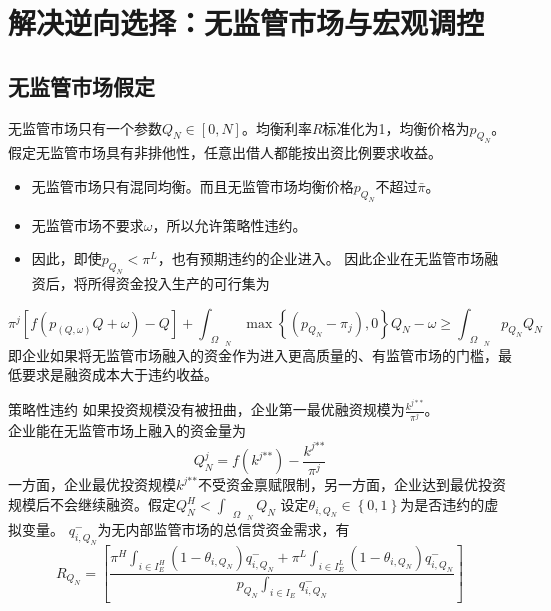 \documentclass{beamer}
\begin{document}
\section{解决逆向选择：无监管市场与宏观调控}
\subsection{无监管市场假定}
\begin{frame}
	无监管市场只有一个参数$Q_{N}\in\left[0,N\right]$。均衡利率$R$标准化为1，均衡价格为$p_{Q_{N}}$。假定无监管市场具有非排他性，任意出借人都能按出资比例要求收益。
	\begin{itemize}
		\item 无监管市场只有混同均衡。而且无监管市场均衡价格$p_{Q_{N}}$不超过$\bar{\pi}$。
		\item 无监管市场不要求$\omega$，所以允许策略性违约。
		\item 因此，即使$p_{Q_{N}}<\pi^L$，也有预期违约的企业进入。
		因此企业在无监管市场融资后，将所得资金投入生产的可行集为


	\end{itemize}
	$${{\pi }^{j}}\left[ f\left( {{p}_{\left( Q,\omega  \right)}}Q+\omega  \right)-Q \right]+\mathop{\int }_{{{\text{ }\!\!\Omega\!\!\text{ }}_{N}}}\max \left\{ \left( {{p}_{{{Q}_{N}}}}-{{\pi }_{j}} \right),0 \right\}{{Q}_{N}}-\omega \ge \mathop{\int }_{{{\text{ }\!\!\Omega\!\!\text{ }}_{N}}}{{p}_{{{Q}_{N}}}}{{Q}_{N}}$$
	即企业如果将无监管市场融入的资金作为进入更高质量的、有监管市场的门槛，最低要求是融资成本大于违约收益。
	
\end{frame}

\begin{frame}{策略性违约}
	如果投资规模没有被扭曲，企业第一最优融资规模为$\frac{k^{j**}}{\pi^j}$。\\
	企业能在无监管市场上融入的资金量为
	$$Q_{N}^{j}=f\left( {{k}^{j\text{**}}} \right)-\frac{{{k}^{j\text{**}}}}{{{\pi }^{j}}}$$
	一方面，企业最优投资规模$ {k}^{j\text{**}} $不受资金禀赋限制，另一方面，企业达到最优投资规模后不会继续融资。假定$Q_{N}^{H}<\mathop{\int }_{{{\text{ }\!\!\Omega\!\!\text{ }}_{N}}}{{Q}_{N}}$
	设定$\theta_{i,Q_N}\in \left\{0,1\right\}$为是否违约的虚拟变量。
	$q_{i,Q_N}^{-}$为无内部监管市场的总信贷资金需求，有
	$${{R}_{{{Q}_{N}}}}=\left[ \frac{{{\pi }^{H}}\mathop{\int }_{i\in I_{E}^{H}}\left( 1-{{\theta }_{i,{{Q}_{N}}}} \right)q_{i,{{Q}_{N}}}^{-}+{{\pi }^{L}}\mathop{\int }_{i\in I_{E}^{L}}\left( 1-{{\theta }_{i,{{Q}_{N}}}} \right)q_{i,{{Q}_{N}}}^{-}}{{{p}_{{{Q}_{N}}}}\mathop{\int }_{i\in {{I}_{E}}}q_{i,{{Q}_{N}}}^{-}} \right]$$
\end{frame}
\end{document}

